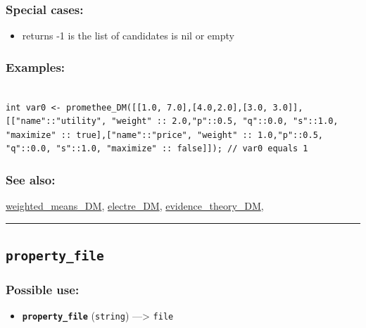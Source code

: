 \documentclass[]{book}
\providecommand{\tightlist}{%
  \setlength{\itemsep}{0pt}\setlength{\parskip}{0pt}}
\theoremstyle{definition}
\theoremstyle{definition}
\theoremstyle{definition}
\theoremstyle{remark}
\begin{document}
\subsubsection{Special cases:}\label{special-cases-114}

\begin{itemize}
\tightlist
\item
  returns -1 is the list of candidates is nil or empty
\end{itemize}

\subsubsection{Examples:}\label{examples-292}

\begin{verbatim}
 
int var0 <- promethee_DM([[1.0, 7.0],[4.0,2.0],[3.0, 3.0]], [["name"::"utility", "weight" :: 2.0,"p"::0.5, "q"::0.0, "s"::1.0, "maximize" :: true],["name"::"price", "weight" :: 1.0,"p"::0.5, "q"::0.0, "s"::1.0, "maximize" :: false]]); // var0 equals 1
\end{verbatim}

\subsubsection{See also:}\label{see-also-170}

\href{operators-s-to-z.html\#weighted_means_dm}{weighted\_means\_DM},
\href{operators-d-to-h.html\#electre_dm}{electre\_DM},
\href{operators-d-to-h.html\#evidence_theory_dm}{evidence\_theory\_DM},

\begin{center}\rule{0.5\linewidth}{\linethickness}\end{center}

\subsection{\texorpdfstring{\texttt{property\_file}}{property\_file}}\label{property_file}

\subsubsection{Possible use:}\label{possible-use-420}

\begin{itemize}
\tightlist
\item
  \textbf{\texttt{property\_file}} (\texttt{string}) ---\textgreater{}
  \texttt{file}
\end{itemize}
\end{document}
